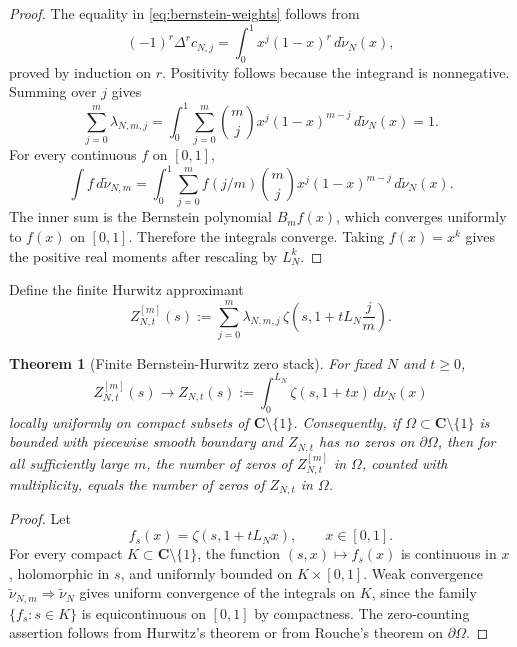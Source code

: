 \documentclass[11pt]{article}
\newcommand{\C}{\mathbf C}
\newcommand{\1}{\mathbf 1}
\newcommand{\wt}{\widetilde}
\newtheorem{theorem}{Theorem}[section]
\numberwithin{equation}{section}
\begin{document}
\begin{proof}
The equality in \eqref{eq:bernstein-weights} follows from
\begin{equation}
  (-1)^r\Delta^r c_{N,j}=\int_0^1x^j(1-x)^r\,d\wt\nu_N(x),
\end{equation}
proved by induction on $r$.  Positivity follows because the integrand is nonnegative.  Summing over $j$ gives
\begin{equation}
  \sum_{j=0}^m\lambda_{N,m,j}
  =\int_0^1\sum_{j=0}^m\binom mjx^j(1-x)^{m-j}\,d\wt\nu_N(x)=1.
\end{equation}
For every continuous $f$ on $[0,1]$,
\begin{equation}
  \int f\,d\wt\nu_{N,m}
  =\int_0^1\sum_{j=0}^m f(j/m)\binom mjx^j(1-x)^{m-j}\,d\wt\nu_N(x).
\end{equation}
The inner sum is the Bernstein polynomial $B_mf(x)$, which converges uniformly to $f(x)$ on $[0,1]$.  Therefore the integrals converge.  Taking $f(x)=x^k$ gives the positive real moments after rescaling by $L_N^k$.
\end{proof}

Define the finite Hurwitz approximant
\begin{equation}\label{eq:finite-Hurwitz-approx}
  Z^{[m]}_{N,t}(s):=\sum_{j=0}^m\lambda_{N,m,j}\,
  \zeta\left(s,1+tL_N\frac jm\right).
\end{equation}

\begin{theorem}[Finite Bernstein-Hurwitz zero stack]\label{thm:finite-zero-stack}
For fixed $N$ and $t\ge0$,
\begin{equation}
  Z^{[m]}_{N,t}(s)\longrightarrow
  Z_{N,t}(s):=\int_0^{L_N}\zeta(s,1+tx)\,d\nu_N(x)
\end{equation}
locally uniformly on compact subsets of $\C\setminus\{1\}$.  Consequently, if $\Omega\subset\C\setminus\{1\}$ is bounded with piecewise smooth boundary and $Z_{N,t}$ has no zeros on $\partial\Omega$, then for all sufficiently large $m$, the number of zeros of $Z^{[m]}_{N,t}$ in $\Omega$, counted with multiplicity, equals the number of zeros of $Z_{N,t}$ in $\Omega$.
\end{theorem}

\begin{proof}
Let
\begin{equation}
  f_s(x)=\zeta(s,1+tL_Nx),\qquad x\in[0,1].
\end{equation}
For every compact $K\subset\C\setminus\{1\}$, the function $(s,x)\mapsto f_s(x)$ is continuous in $x$, holomorphic in $s$, and uniformly bounded on $K\times[0,1]$.  Weak convergence $\wt\nu_{N,m}\Rightarrow\wt\nu_N$ gives uniform convergence of the integrals on $K$, since the family $\{f_s:s\in K\}$ is equicontinuous on $[0,1]$ by compactness.  The zero-counting assertion follows from Hurwitz's theorem or from Rouche's theorem on $\partial\Omega$.
\end{proof}
\end{document}

